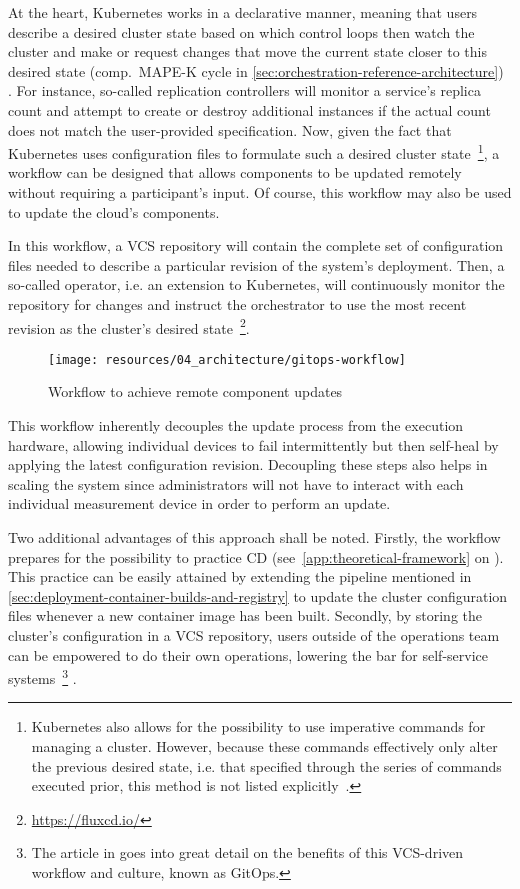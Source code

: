 At the heart, Kubernetes works in a declarative manner, meaning that users describe a desired cluster state based on which control loops then watch the cluster and make or request changes that move the current state closer to this desired state (comp.~\acs{MAPE-K} cycle in \autoref{sec:orchestration-reference-architecture}) \cite{kubernetesControllers}. For instance, so-called replication controllers will monitor a service's replica count and attempt to create or destroy additional instances if the actual count does not match the user-provided specification. Now, given the fact that Kubernetes uses configuration files to formulate such a desired cluster state~\footnote{Kubernetes also allows for the possibility to use imperative commands for managing a cluster. However, because these commands effectively only alter the previous desired state, i.e. that specified through the series of commands executed prior, this method is not listed explicitly~\cite{kubernetesImperative}.}, a workflow can be designed that allows components to be updated remotely without requiring a participant's input. Of course, this workflow may also be used to update the cloud's components.

In this workflow, a \acs{VCS} repository will contain the complete set of configuration files needed to describe a particular revision of the system's deployment. Then, a so-called operator, i.e. an extension to Kubernetes, will continuously monitor the repository for changes and instruct the orchestrator to use the most recent revision as the cluster's desired state~\footnote{\url{https://fluxcd.io/}}.

\begin{figure}[hbt]
  \centering
  \texttt{[image: resources/04\_architecture/gitops-workflow]}
  \caption{Workflow to achieve remote component updates}
  \label{fig:gitops-workflow}
\end{figure}

\FloatBarrier

This workflow inherently decouples the update process from the execution hardware, allowing individual devices to fail intermittently but then self-heal by applying the latest configuration revision. Decoupling these steps also helps in scaling the system since administrators will not have to interact with each individual measurement device in order to perform an update.

Two additional advantages of this approach shall be noted. Firstly, the workflow prepares for the possibility to practice \acl{CD} (see~\autoref{app:theoretical-framework} on ). This practice can be easily attained by extending the pipeline mentioned in \autoref{sec:deployment-container-builds-and-registry} to update the cluster configuration files whenever a new container image has been built. Secondly, by storing the cluster's configuration in a \acs{VCS} repository, users outside of the operations team can be empowered to do their own operations, lowering the bar for self-service systems~\footnote{The article in \cite{limoncelli2018gitops} goes into great detail on the benefits of this \acs{VCS}-driven workflow and culture, known as GitOps.} \cite[p.~38]{limoncelli2018gitops}.

